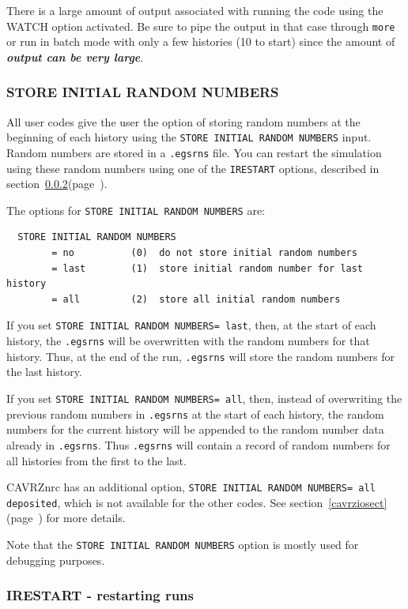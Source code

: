 \documentclass[12pt,twoside]{article}  %
\newcommand{\lpage}[1]{(page~\pageref{#1})}
\begin{document}
There is a large amount of output associated with running the code
using the WATCH option activated. Be sure to pipe the output
in that case through \verb+more+ or run in batch mode with only a few
histories (10 to start) since the amount of {\bfseries {\em output can be
very large}}.

\subsubsection{STORE INITIAL RANDOM NUMBERS}
\label{rnssect}
All user codes give the user the option of storing random
numbers at the beginning of each history using
the {\tt STORE INITIAL RANDOM NUMBERS} input.  Random numbers are stored
in a {\tt .egsrns} file.  You can restart the simulation
using these random numbers using one of the {\tt IRESTART} options,
described in section~\ref{restartsect}\lpage{restartsect}.

The options for {\tt STORE INITIAL RANDOM NUMBERS} are:

\begin{verbatim}
  STORE INITIAL RANDOM NUMBERS
        = no          (0)  do not store initial random numbers
        = last        (1)  store initial random number for last history
        = all         (2)  store all initial random numbers
\end{verbatim}

If you set {\tt STORE INITIAL RANDOM NUMBERS= last}, then, at the start
of each history, the {\tt .egsrns} will be overwritten with the random
numbers for that history.  Thus, at the end of the run, {\tt .egsrns}
will store the random numbers for the last history.

If you set {\tt STORE INITIAL RANDOM NUMBERS= all}, then, instead of
overwriting the previous random numbers in {\tt .egsrns} at the start of
each history, the random numbers for the current history will be appended
to the random number data already in {\tt .egsrns}.  Thus {\tt .egsrns} will
contain a record of random numbers for all histories from the first to
the last.

CAVRZnrc has an additional option,
{\tt STORE INITIAL RANDOM NUMBERS= all deposited},
which is not available for the other codes.  See
section~\ref{cavrziosect}\lpage{cavrziosect} for more details.

Note that the {\tt STORE INITIAL RANDOM NUMBERS} option is mostly used for
debugging purposes.

\subsubsection{IRESTART - restarting runs}
\label{restartsect}
\end{document}
